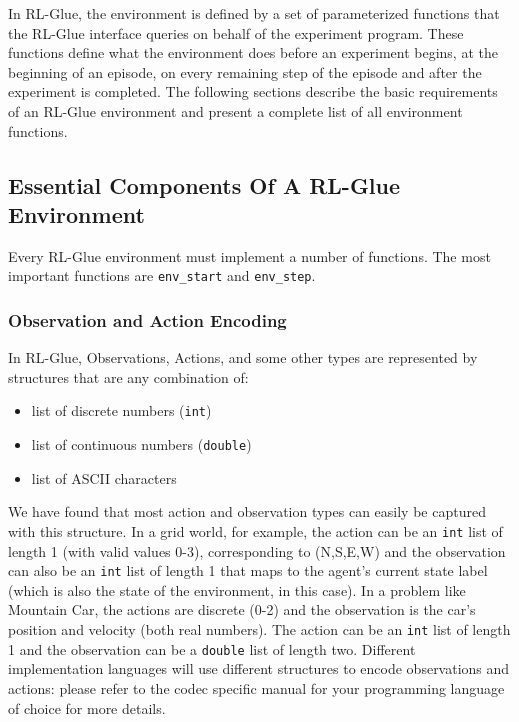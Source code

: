\documentclass[11pt]{article}
\begin{document}
In RL-Glue, the environment is defined by a set of parameterized functions that the RL-Glue interface queries on behalf of the experiment program. These functions define what the environment does before an experiment begins, at the beginning of an episode, on every remaining step of the episode and after the experiment is completed. The following sections describe the basic requirements of an RL-Glue environment and present a complete list of all environment functions.

\subsection{Essential Components Of A RL-Glue Environment}
\label{envp1}

Every RL-Glue environment must implement a number of functions.  The most important functions are \texttt{env\_start} and \texttt{env\_step}.   

\subsubsection{Observation and Action Encoding}
In RL-Glue, Observations, Actions, and some other types are represented by structures that are any combination of:
\begin{itemize}
\item list of discrete numbers (\texttt{int})
\item list of continuous numbers (\texttt{double})
\item list of ASCII characters
\end{itemize}

We have found that most action and observation types can easily be captured with this structure.  In a grid world, for example, the action can be an \texttt{int} list of length 1 (with valid values 0-3), corresponding to (N,S,E,W) and the observation can also be an \texttt{int} list of length 1 that maps to the agent's current state label (which is also the state of the environment, in this case). In a problem like Mountain Car, the actions are discrete (0-2) and the observation is the car's position and velocity (both real numbers). The action can be an \texttt{int} list of length 1 and the observation can be a \texttt{double} list of length two. Different implementation languages will use different structures to encode observations and actions: please refer to the codec specific manual for your programming language of  choice for more details.
\end{document}
